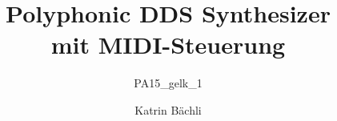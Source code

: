 \documentclass[ngerman]{zhawines}
\begin{document}
	\author{Katrin Bächli}
	\renewcommand{\betreuer}{Prof. Hans-Joachim Gelke}
	\renewcommand{\nebenbetreuer}{Dr. Matthias Rosenthal}
	\title{Polyphonic DDS Synthesizer\\ mit MIDI-Steuerung}
	\subtitle{PA15\_gelk\_1}


	\maketitle{}
	
	\headings
	
	
			
			
		
	
	
	\tableofcontents				
			
	 	
	 	 
	 	
	
	
	
		
	

	
\end{document}
